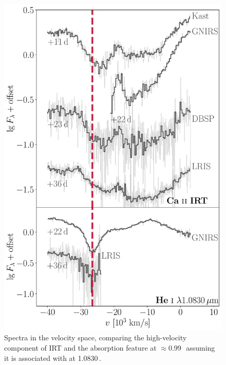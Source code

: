 \documentclass[twocolumn]{aastex631}
\begin{document}
\begin{figure}
    \centering
    \includegraphics[width=\linewidth]{CaII_HeI_hvf.pdf}
    \caption{Spectra in the velocity space, comparing the high-velocity component of  IRT and the absorption feature at $\approx$0.99\,\micron\ assuming it is associated with  at 1.0830\,\micron.}
    \label{fig:hvf_comp}
\end{figure}
\end{document}
